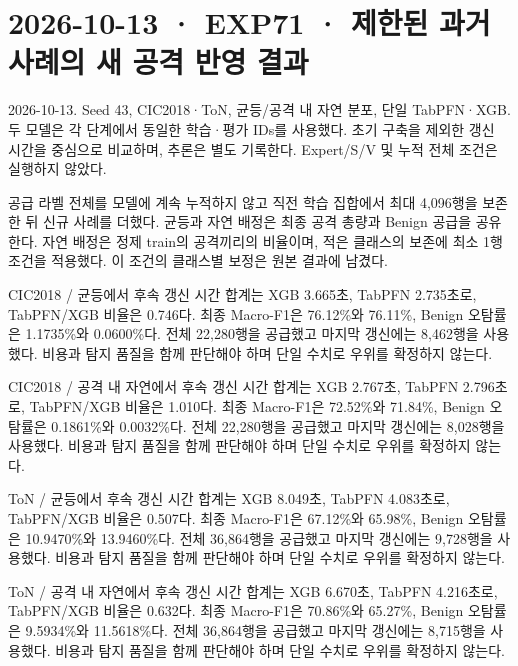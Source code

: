 \section{2026-10-13 · EXP71 · 제한된 과거 사례의 새 공격 반영 결과}
\label{report:20261013_exp71_results}
2026-10-13. Seed 43, CIC2018·ToN, 균등/\allowbreak{}공격 내 자연 분포, 단일 TabPFN·XGB. 두 모델은 각 단계에서 동일한 학습·평가 IDs를 사용했다. 초기 구축을 제외한 갱신 시간을 중심으로 비교하며, 추론은 별도 기록한다. Expert/\allowbreak{}S/\allowbreak{}V 및 누적 전체 조건은 실행하지 않았다.

공급 라벨 전체를 모델에 계속 누적하지 않고 직전 학습 집합에서 최대 4,096행을 보존한 뒤 신규 사례를 더했다. 균등과 자연 배정은 최종 공격 총량과 Benign 공급을 공유한다. 자연 배정은 정제 train의 공격끼리의 비율이며, 적은 클래스의 보존에 최소 1행 조건을 적용했다. 이 조건의 클래스별 보정은 원본 결과에 남겼다.

CIC2018 /\allowbreak{} 균등에서 후속 갱신 시간 합계는 XGB 3.665초, TabPFN 2.735초로, TabPFN/\allowbreak{}XGB 비율은 0.746다. 최종 Macro-F1은 76.12\%와 76.11\%, Benign 오탐률은 1.1735\%와 0.0600\%다. 전체 22,280행을 공급했고 마지막 갱신에는 8,462행을 사용했다. 비용과 탐지 품질을 함께 판단해야 하며 단일 수치로 우위를 확정하지 않는다.

CIC2018 /\allowbreak{} 공격 내 자연에서 후속 갱신 시간 합계는 XGB 2.767초, TabPFN 2.796초로, TabPFN/\allowbreak{}XGB 비율은 1.010다. 최종 Macro-F1은 72.52\%와 71.84\%, Benign 오탐률은 0.1861\%와 0.0032\%다. 전체 22,280행을 공급했고 마지막 갱신에는 8,028행을 사용했다. 비용과 탐지 품질을 함께 판단해야 하며 단일 수치로 우위를 확정하지 않는다.

ToN /\allowbreak{} 균등에서 후속 갱신 시간 합계는 XGB 8.049초, TabPFN 4.083초로, TabPFN/\allowbreak{}XGB 비율은 0.507다. 최종 Macro-F1은 67.12\%와 65.98\%, Benign 오탐률은 10.9470\%와 13.9460\%다. 전체 36,864행을 공급했고 마지막 갱신에는 9,728행을 사용했다. 비용과 탐지 품질을 함께 판단해야 하며 단일 수치로 우위를 확정하지 않는다.

ToN /\allowbreak{} 공격 내 자연에서 후속 갱신 시간 합계는 XGB 6.670초, TabPFN 4.216초로, TabPFN/\allowbreak{}XGB 비율은 0.632다. 최종 Macro-F1은 70.86\%와 65.27\%, Benign 오탐률은 9.5934\%와 11.5618\%다. 전체 36,864행을 공급했고 마지막 갱신에는 8,715행을 사용했다. 비용과 탐지 품질을 함께 판단해야 하며 단일 수치로 우위를 확정하지 않는다.

